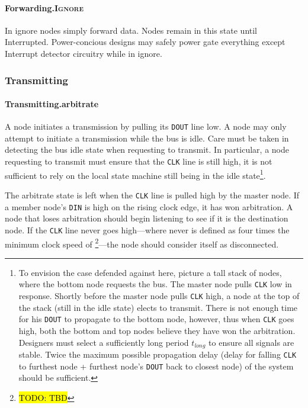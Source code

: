 \paragraph{Forwarding.\textsc{Ignore}}
In {\sc ignore} nodes simply forward data. Nodes remain in this state until
Interrupted. Power-concious designs may safely power gate everything
except Interrupt detector circuitry while in {\sc ignore}.

\subsubsection{Transmitting}

\paragraph{Transmitting.{\sc arbitrate}}
\label{sec:state-arbitrate}
A node initiates a transmission by pulling its {\tt DOUT} line low. A node may
only attempt to initiate a transmission while the bus is idle. Care must be
taken in detecting the bus idle state when requesting to transmit. In
particular, a node requesting to transmit must ensure that the {\tt CLK} line
is still high, it is not sufficient to rely on the local state machine still
being in the {\sc idle} state\footnote{To envision the case defended against
here, picture a tall stack of nodes, where the bottom node requests the bus.
The master node pulls {\tt CLK} low in response. Shortly before the master
node pulls {\tt CLK} high, a node at the top of the stack (still in the {\sc
idle} state) elects to transmit. There is not enough time for his {\tt DOUT}
to propagate to the bottom node, however, thus when {\tt CLK} goes high, both
the bottom and top nodes believe they have won the arbitration. Designers must
select a sufficiently long period $t_{long}$ to ensure all signals are stable.
Twice the maximum possible propagation delay (delay for falling {\tt CLK} to
furthest node + furthest node's {\tt DOUT} back to closest node) of the system
should be sufficient.}.

The {\sc arbitrate} state is left when the {\tt CLK} line is pulled high by
the master node. If a member node's {\tt DIN} is high on the rising clock
edge, it has won arbitration. A node that loses arbitration should begin
listening to see if it is the destination node. If the {\tt CLK} line never
goes high---where never is defined as four times the minimum clock speed of
\bus\footnote{\hl{TODO: TBD}}---the node should consider itself as
disconnected.

